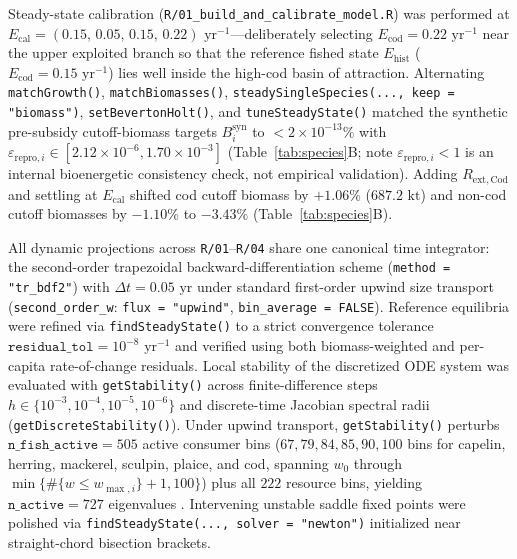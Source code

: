 \documentclass[11pt,letterpaper]{article}
\begin{document}
Steady-state calibration (\texttt{R/01\_build\_\allowbreak and\_calibrate\_\allowbreak model.R}) was performed at $E_{\mathrm{cal}} = (0.15,\allowbreak\, 0.05,\allowbreak\, 0.15,\allowbreak\, 0.22)\text{ yr}^{-1}$---deliberately selecting $E_{\mathrm{cod}} = 0.22\text{ yr}^{-1}$ near the upper exploited branch so that the reference fished state $E_{\mathrm{hist}}$ ($E_{\mathrm{cod}} = 0.15\text{ yr}^{-1}$) lies well inside the high-cod basin of attraction. Alternating \texttt{matchGrowth()}, \texttt{matchBiomasses()}, \texttt{steadySingleSpecies(\allowbreak ..., keep = "biomass")}, \texttt{setBevertonHolt()}, and \texttt{tuneSteadyState()} matched the synthetic pre-subsidy cutoff-biomass targets $B_i^{\mathrm{syn}}$ to $< 2 \times 10^{-13}\%$ with $\varepsilon_{\mathrm{repro},i} \in [2.12 \times 10^{-6}, 1.70 \times 10^{-3}]$ (Table~\ref{tab:species}B; note $\varepsilon_{\mathrm{repro},i} < 1$ is an internal bioenergetic consistency check, not empirical validation). Adding $R_{\mathrm{ext,Cod}}$ and settling at $E_{\mathrm{cal}}$ shifted cod cutoff biomass by $+1.06\%$ ($687.2\text{ kt}$) and non-cod cutoff biomasses by $-1.10\%$ to $-3.43\%$ (Table~\ref{tab:species}B).

All dynamic projections across \texttt{R/01}--\texttt{R/04} share one canonical time integrator: the second-order trapezoidal backward-differentiation scheme (\texttt{method = "tr\_bdf2"}) with $\Delta t = 0.05\text{ yr}$ under standard first-order upwind size transport (\texttt{second\_order\_w}: \texttt{flux = "upwind"}, \texttt{bin\_average = FALSE}). Reference equilibria were refined via \texttt{findSteadyState()} to a strict convergence tolerance $\texttt{residual\_tol} = 10^{-8}\text{ yr}^{-1}$ and verified using both biomass-weighted and per-capita rate-of-change residuals. Local stability of the discretized ODE system was evaluated with \texttt{getStability()} across finite-difference steps $h \in \{10^{-3}, 10^{-4}, 10^{-5}, 10^{-6}\}$ and discrete-time Jacobian spectral radii (\texttt{getDiscreteStability()}). Under upwind transport, \texttt{getStability()} perturbs $\texttt{n\_fish\_active} = 505$ active consumer bins ($67, 79, 84, 85, 90, 100$ bins for capelin, herring, mackerel, sculpin, plaice, and cod, spanning $w_0$ through $\min\{\#\{w \le w_{\max,i}\} + 1, 100\}$) plus all $222$ resource bins, yielding $\texttt{n\_active} = 727$ eigenvalues \citep{datta2011stability,mizer2026package}. Intervening unstable saddle fixed points were polished via \texttt{findSteadyState(..., solver = "newton")} initialized near straight-chord bisection brackets.
\end{document}
